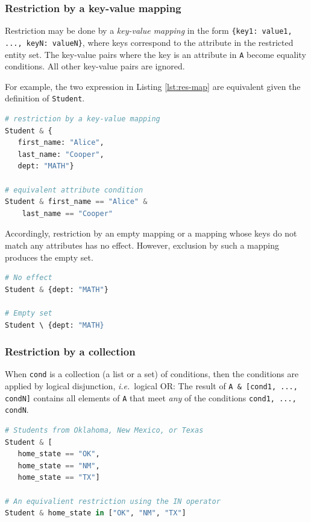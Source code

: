 \documentclass[letter,10pt]{article}
\begin{document}
\subsubsection{Restriction by a key-value mapping}
Restriction may be done by a \emph{key-value mapping} in the form \lstinline${key1: value1, ..., keyN: valueN}$, where 
keys correspond to the attribute in the restricted entity set.  
The key-value pairs where the key is an attribute in \lstinline$A$ become equality conditions. 
All other key-value pairs are ignored.  

For example, the two expression in Listing \ref{lst:res-map} are equivalent given the definition of \lstinline$Student$.
\begin{lstlisting}[language=Python, caption={Equivalent expressions using restrictions by a mapping and by attribute conditions.  The condition on \lstinline$dept$ is ignored because it is not an attribute in \lstinline$Student$.}, label={lst:res-map}]
# restriction by a key-value mapping
Student & {
   first_name: "Alice", 
   last_name: "Cooper", 
   dept: "MATH"}

# equivalent attribute condition 
Student & first_name == "Alice" & 
    last_name == "Cooper"
\end{lstlisting}

Accordingly, restriction by an empty mapping or a mapping whose keys do not match any attributes has no effect.  
However, exclusion by such a mapping produces the empty set.

\begin{lstlisting}[language=Python, caption={Restriction by a mapping with no matching keys}, label={lst:res-empty-map}]
# No effect 
Student & {dept: "MATH"}

# Empty set
Student \ {dept: "MATH}
\end{lstlisting}

\subsubsection{Restriction by a collection}
When \lstinline$cond$ is a collection (a list or a set) of conditions, then the conditions are applied by logical disjunction, \emph{i.e.}\ logical {OR}:
The result of \lstinline$A & [cond1, ..., condN]$ contains all elements of \lstinline$A$ that meet \emph{any} of the conditions \lstinline$cond1, ..., condN$.

\begin{lstlisting}[language=Python, caption={Restrictions by a collection of conditions.}, label={lst:res-list}]
# Students from Oklahoma, New Mexico, or Texas
Student & [
   home_state == "OK", 
   home_state == "NM", 
   home_state == "TX"] 

# An equivalient restriction using the IN operator
Student & home_state in ["OK", "NM", "TX"]
\end{lstlisting}
\end{document}
